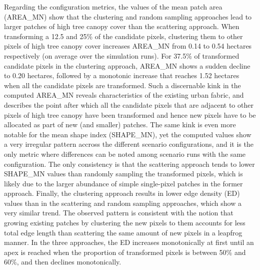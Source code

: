 \documentclass[10pt,letterpaper]{article}
\begin{document}
Regarding the configuration metrics, the values of the mean patch area (AREA\_MN) show that the clustering and random sampling approaches lead to larger patches of high tree canopy cover than the scattering approach.
When transforming a 12.5 and 25\% of the candidate pixels, clustering them to other pixels of high tree canopy cover increases AREA\_MN from 0.14 to 0.54 hectares respectively (on average over the simulation runs). For 37.5\% of transformed candidate pixels in the clustering approach, AREA\_MN shows a sudden decline to 0.20 hectares, followed by a monotonic increase that reaches 1.52 hectares when all the candidate pixels are transformed. Such a discernable kink in the computed AREA\_MN reveals characteristics of the existing urban fabric, and describes the point after which all the candidate pixels that are adjacent to other pixels of high tree canopy have been transformed and hence new pixels have to be allocated as part of new (and smaller) patches.
The same kink is even more notable for the mean shape index (SHAPE\_MN), yet the computed values show a very irregular pattern accross the different scenario configurations, and it is the only metric where differences can be noted among scenario runs with the same configuration. The only consistency is that the scattering approach tends to lower SHAPE\_MN values than randomly sampling the transformed pixels, which is likely due to the larger abundance of simple single-pixel patches in the former approach.
Finally, the clustering approach results in lower edge density (ED) values than in the scattering and random sampling approaches, which show a very similar trend.
The observed pattern is consistent with the notion that growing existing patches by clustering the new pixels to them accounts for less total edge length than scattering the same amount of new pixels in a leapfrog manner.
In the three approaches, the ED increases monotonically at first until an apex is reached when the proportion of transformed pixels is between 50\% and 60\%, and then declines monotonically.
\end{document}
